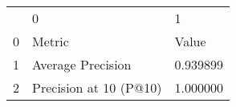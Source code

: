 \begin{tabular}{lll}
 & 0 & 1 \\
0 & Metric & Value \\
1 & Average Precision & 0.939899 \\
2 & Precision at 10 (P@10) & 1.000000 \\
\end{tabular}
